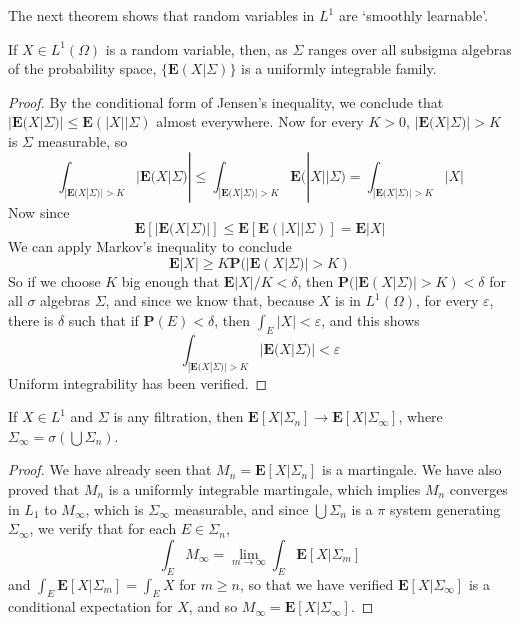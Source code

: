 The next theorem shows that random variables in $L^1$ are `smoothly learnable'.

\begin{lemma}
    If $X \in L^1(\Omega)$ is a random variable, then, as $\Sigma$ ranges over all subsigma algebras of the probability space, $\{ \mathbf{E}(X|\Sigma)  \}$ is a uniformly integrable family.
\end{lemma}
\begin{proof}
    By the conditional form of Jensen's inequality, we conclude that $|\mathbf{E}(X|\Sigma)| \leq \mathbf{E}(|X| | \Sigma)$ almost everywhere. Now for every $K > 0$, $|\mathbf{E}(X|\Sigma)| > K$ is $\Sigma$ measurable, so
    \[ \int_{|\mathbf{E}(X|\Sigma)| > K} |\mathbf{E}(X|\Sigma)| \leq \int_{|\mathbf{E}(X | \Sigma)| > K} \mathbf{E}(|X| | \Sigma) = \int_{|\mathbf{E}(X|\Sigma)| > K} |X|  \]
    Now since
    \[ \mathbf{E} \left[ |\mathbf{E}(X|\Sigma)| \right] \leq \mathbf{E} \left[ \mathbf{E}(|X| | \Sigma) \right] = \mathbf{E} |X| \]
    We can apply Markov's inequality to conclude
    \[ \mathbf{E} |X| \geq K \mathbf{P}(|\mathbf{E}(X|\Sigma)| > K) \]
    So if we choose $K$ big enough that $\mathbf{E} |X|/K < \delta$, then $\mathbf{P}(|\mathbf{E}(X|\Sigma)| > K) < \delta$ for all $\sigma$ algebras $\Sigma$, and since we know that, because $X$ is in $L^1(\Omega)$, for every $\varepsilon$, there is $\delta$ such that if $\mathbf{P}(E) < \delta$, then $\int_E |X| < \varepsilon$, and this shows
    \[ \int_{|\mathbf{E}(X|\Sigma)| > K} |\mathbf{E}(X|\Sigma)| < \varepsilon \]
    Uniform integrability has been verified.
\end{proof}

\begin{theorem}
    If $X \in L^1$ and $\Sigma$ is any filtration, then $\mathbf{E}[X|\Sigma_n] \to \mathbf{E}[X|\Sigma_\infty]$, where $\Sigma_\infty = \sigma(\bigcup \Sigma_n)$.
\end{theorem}
\begin{proof}
    We have already seen that $M_n = \mathbf{E}[X|\Sigma_n]$ is a martingale. We have also proved that $M_n$ is a uniformly integrable martingale, which implies $M_n$ converges in $L_1$ to $M_\infty$, which is $\Sigma_\infty$ measurable, and since $\bigcup \Sigma_n$ is a $\pi$ system generating $\Sigma_\infty$, we verify that for each $E \in \Sigma_n$,
    \[ \int_E M_\infty = \lim_{m \to \infty} \int_E \mathbf{E}[X|\Sigma_m] \]
    and $\int_E \mathbf{E}[X|\Sigma_m] = \int_E X$ for $m \geq n$, so that we have verified $\mathbf{E}[X|\Sigma_\infty]$ is a conditional expectation for $X$, and so $M_\infty = \mathbf{E}[X|\Sigma_\infty]$.
\end{proof}

